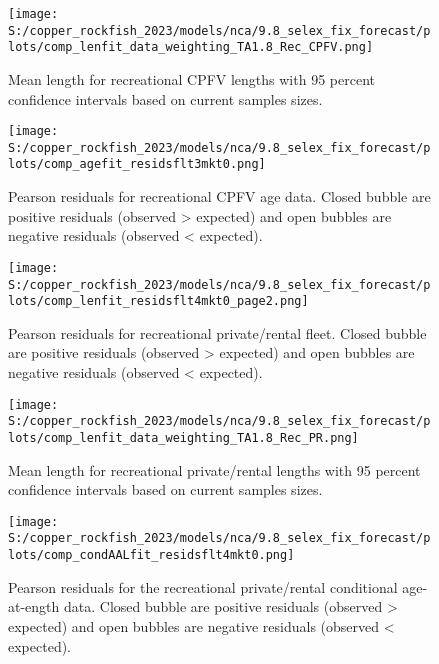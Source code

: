 \documentclass[11pt,
  english,
  letterpaper,
]{article}
\begin{document}
\pagebreak

\begin{figure}
\centering
\texttt{[image: S:/copper\_rockfish\_2023/models/nca/9.8\_selex\_fix\_forecast/plots/comp\_lenfit\_data\_weighting\_TA1.8\_Rec\_CPFV.png]}
\caption{Mean length for recreational CPFV lengths with 95 percent confidence intervals based on current samples sizes.\label{fig:rec-cpfv-mean-len-fit}}
\end{figure}

\pagebreak

\begin{figure}
\centering
\texttt{[image: S:/copper\_rockfish\_2023/models/nca/9.8\_selex\_fix\_forecast/plots/comp\_agefit\_residsflt3mkt0.png]}
\caption{Pearson residuals for recreational CPFV age data. Closed bubble are positive residuals (observed \textgreater{} expected) and open bubbles are negative residuals (observed \textless{} expected).\label{fig:rec-cpfv-age-pearson}}
\end{figure}

\pagebreak

\begin{figure}
\centering
\texttt{[image: S:/copper\_rockfish\_2023/models/nca/9.8\_selex\_fix\_forecast/plots/comp\_lenfit\_residsflt4mkt0\_page2.png]}
\caption{Pearson residuals for recreational private/rental fleet. Closed bubble are positive residuals (observed \textgreater{} expected) and open bubbles are negative residuals (observed \textless{} expected).\label{fig:rec-pr-pearson}}
\end{figure}

\pagebreak

\begin{figure}
\centering
\texttt{[image: S:/copper\_rockfish\_2023/models/nca/9.8\_selex\_fix\_forecast/plots/comp\_lenfit\_data\_weighting\_TA1.8\_Rec\_PR.png]}
\caption{Mean length for recreational private/rental lengths with 95 percent confidence intervals based on current samples sizes.\label{fig:rec-pr-mean-len-fit}}
\end{figure}

\pagebreak

\begin{figure}
\centering
\texttt{[image: S:/copper\_rockfish\_2023/models/nca/9.8\_selex\_fix\_forecast/plots/comp\_condAALfit\_residsflt4mkt0.png]}
\caption{Pearson residuals for the recreational private/rental conditional age-at-ength data. Closed bubble are positive residuals (observed \textgreater{} expected) and open bubbles are negative residuals (observed \textless{} expected).\label{fig:rec-pr-age-pearson}}
\end{figure}
\end{document}
